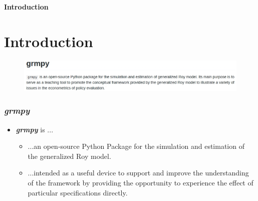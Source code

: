 \begin{frame}\begin{center}
\LARGE\textbf{Introduction}
\end{center}\end{frame}

\section{Introduction}
\begin{frame}
\begin{figure}
  \includegraphics[scale=0.3]{figures/grmpy_intro.jpg}
\end{figure}
\end{frame}

\begin{frame}
\frametitle{\textit{grmpy}}

\begin{itemize}\setlength\itemsep{1em}
  \item \textit{\textbf{grmpy}} is ...
    \begin{itemize}\setlength\itemsep{1em}
      \item ...an open-source Python Package for the simulation and estimation of the generalized Roy model.
      \item ...intended as a useful device to support and improve the understanding of the framework by providing the opportunity to experience the effect of particular specifications directly.
    \end{itemize}
\end{itemize}
\end{frame}
